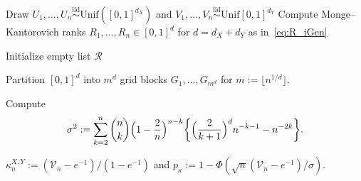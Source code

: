 \documentclass[11pt]{article}
\newcommand{\iid}{\stackrel{\mathrm{iid}}\sim}
\begin{document}
\begin{algorithm}[htbp]
\caption{\label{Algo:CoverCorr}Pseudocode for computing the coverage correlation coefficient}
\SetAlgoLined
{}

Draw $U_1,\ldots,U_n \iid \mathrm{Unif}([0,1]^{d_X})$ and $V_1,\ldots,V_n\iid \mathrm{Unif}[0,1]^{d_Y}$\;
Compute Monge--Kantorovich ranks $R_1,\ldots,R_n \in [0,1]^d$ for $d= d_X+d_Y$ as in~\eqref{eq:R_iGen}\;

Initialize empty list $\mathcal{R}$\;


Partition $[0,1]^d$ into $m^d$ grid blocks $G_1,\ldots,G_{m^d}$ for $m := \lfloor n^{1/d}\rfloor$. \;

Compute 
\[
\sigma^2 := \sum_{k=2}^n\binom{n}{k}\Bigl(1-\frac{2}{n}\Bigr)^{n-k}\biggl\{\Bigl(\frac{2}{k+1}\Bigr)^dn^{-k-1}-n^{-2k}\biggl\}.
\]

\Return $\kappa_n^{X,Y}:= (\mathcal{V}_n-e^{-1})/(1-e^{-1})$ and $p_\kappa := 1 - \Phi(\sqrt{n}(\mathcal{V}_n - e^{-1})/\sigma)$.
\end{algorithm}
\end{document}
